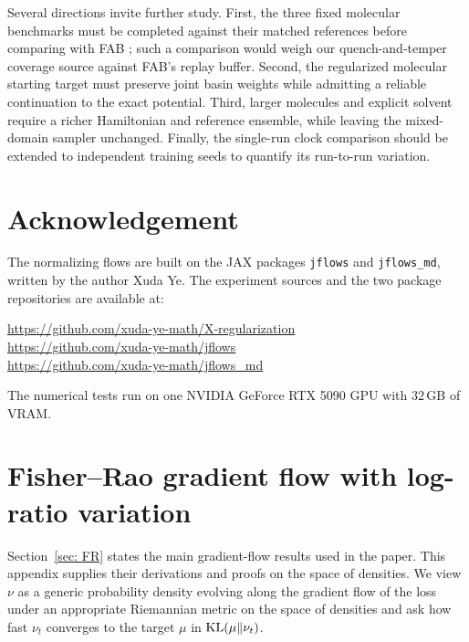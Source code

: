 \documentclass{article}
\begin{document}
Several directions invite further study. First, the three fixed molecular benchmarks must be completed against their matched references before comparing with FAB \citep{midgley2022flow}; such a comparison would weigh our quench-and-temper coverage source against FAB's replay buffer. Second, the regularized molecular starting target must preserve joint basin weights while admitting a reliable continuation to the exact potential. Third, larger molecules and explicit solvent require a richer Hamiltonian and reference ensemble, while leaving the mixed-domain sampler unchanged. Finally, the single-run clock comparison should be extended to independent training seeds to quantify its run-to-run variation.


\section*{Acknowledgement}

The normalizing flows are built on the JAX packages \texttt{jflows} and \texttt{jflows\_md}, written by the author Xuda Ye. The experiment sources and the two package repositories are available at:
\begin{tcolorbox}[colback=gray!12,boxrule=0pt,arc=2pt,left=6pt,right=6pt,top=4pt,bottom=4pt]
\url{https://github.com/xuda-ye-math/X-regularization}\\
\url{https://github.com/xuda-ye-math/jflows}\\
\url{https://github.com/xuda-ye-math/jflows_md}
\end{tcolorbox}
\noindent
The numerical tests run on one NVIDIA GeForce RTX 5090 GPU with
$32$\,GB of VRAM.

\clearpage
\appendix

\section{Fisher--Rao gradient flow with log-ratio variation}
\label{sec: appendix-FR}

Section~\ref{sec: FR} states the main gradient-flow results used in the paper. This appendix supplies their derivations and proofs on the space of densities. We view $\nu$ as a generic probability density evolving along the gradient flow of the loss under an appropriate Riemannian metric on the space of densities \citep{ambrosio2008gradient,villani2009optimal} and ask how fast $\nu_t$ converges to the target $\mu$ in $\mathrm{KL}(\mu\|\nu_t)$.
\end{document}
